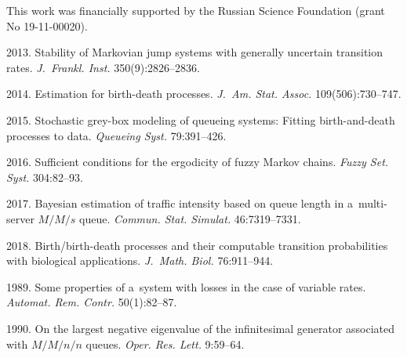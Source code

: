 

\Ack
\noindent
This work was financially supported by the Russian Science Foundation 
(grant No 19-11-00020).



  \begin{multicols}{2}

\renewcommand{\bibname}{\protect\rmfamily References}

{\small\frenchspacing
 {%
 \begin{thebibliography}{99}
 
 2013.  Stability of Markovian jump systems with generally uncertain 
 transition rates. \textit{J.~Frankl. Inst.} 350(9):2826--2836.
 
 2014. Estimation for birth-death processes. 
 \textit{J.~Am. Stat. Assoc.} 109(506):730--747.


 2015. Stochastic grey-box modeling of queueing systems: 
 Fitting birth-and-death processes to data. \textit{Queueing Syst.} 79:391--426.


2016. Sufficient conditions for the ergodicity of fuzzy Markov chains. 
\textit{Fuzzy Set. Syst.} 304:82--93.

2017. Bayesian estimation of traffic intensity based on queue length 
in a~multi-server $M/M/s$ queue. 
\textit{Commun. Stat. Simulat.} 46:7319--7331.


 2018. Birth/birth-death processes and their computable transition probabilities 
 with biological applications. \textit{J.~Math. Biol.} 76:911--944.

 1989. Some properties of a~system with losses in the 
case of variable rates. 
\textit{Automat. Rem. Contr.} 50(1):82--87. 

 1990. On the largest negative eigenvalue of the 
infinitesimal generator associated with $M/M/n/n$ queues.
\textit{Oper. Res. Lett.} 9:59--64.


\end{thebibliography}}}
\end{multicols}
